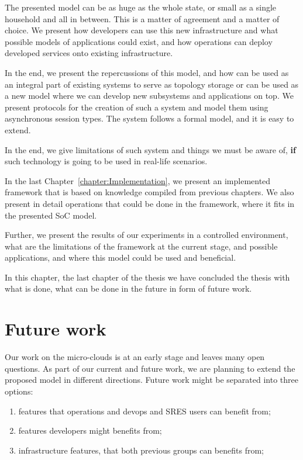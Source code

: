 The presented model can be as huge as the whole state, or small as a single household and all in between. This is a matter of agreement and a matter of choice. We present how developers can use this new infrastructure and what possible models of applications could exist, and how operations can deploy developed services onto existing infrastructure.

In the end, we present the repercussions of this model, and how can be used as an integral part of existing systems to serve as topology storage or can be used as a new model where we can develop new subsystems and applications on top. We present protocols for the creation of such a system and model them using asynchronous session types. The system follows a formal model, and it is easy to extend.

In the end, we give limitations of such system and things we must be aware of, \textbf{if} such technology is going to be used in real-life scenarios.

In the last Chapter~\ref{chapter:Implementation}, we present an implemented framework that is based on knowledge compiled from previous chapters. We also present in detail operations that could be done in the framework, where it fits in the presented SoC model.

Further, we present the results of our experiments in a controlled environment, what are the limitations of the framework at the current stage, and possible applications, and where this model could be used and beneficial.

In this chapter, the last chapter of the thesis we have concluded the thesis with what is done, what can be done in the future in form of future work.
%
%
\section{Future work}\label{sec:future_work}
%
Our work on the micro-clouds is at an early stage and leaves many open questions. As part of our current and future work, we are planning to extend the proposed model in different directions. Future work might be separated into three options:
 
\begin{enumerate}[start=1,label={(\bfseries \arabic*)}]
	\item features that operations and devops and SRES users can benefit from;
	\item features developers might benefits from;
	\item infrastructure features, that both previous groups can benefits from;
\end{enumerate}


